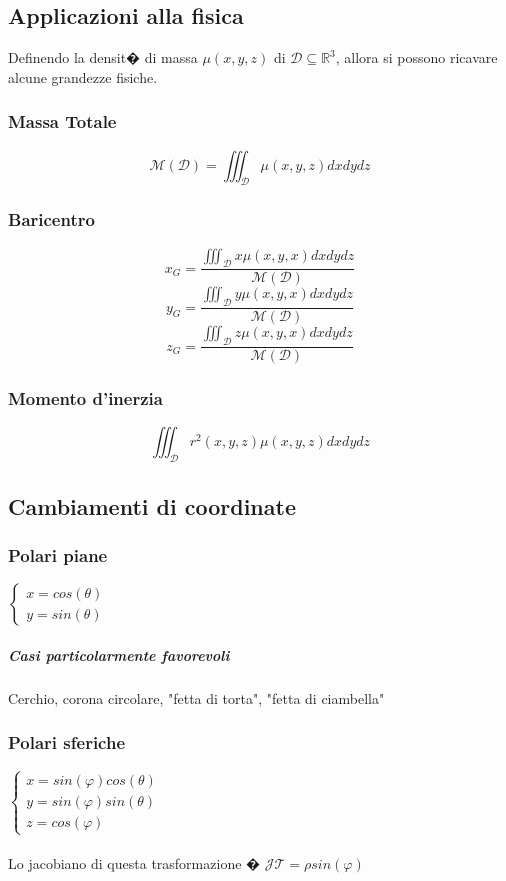 \documentclass[10pt,a4paper]{report}
\begin{document}
		\subsection*{Applicazioni alla fisica}
		Definendo la densit� di massa $ \mu (x,y,z) $ di $\mathcal{D}\subseteq \mathbb{R}^{3}$, allora si possono ricavare alcune grandezze fisiche.
			\subsubsection{Massa Totale}
			\[ \mathcal{M}(\mathcal{D})= \iiint_{\mathcal{D}} \mu(x,y,z) dx dy dz \]
			
			\subsubsection{Baricentro}
			\[ x_{G}=\frac{\iiint_{\mathcal{D}} x \mu (x,y,x) dx dy dz}{ \mathcal{M}(\mathcal{D})} \]
			\[ y_{G}=\frac{\iiint_{\mathcal{D}} y \mu (x,y,x) dx dy dz}{ \mathcal{M}(\mathcal{D})} \]
			\[ z_{G}=\frac{\iiint_{\mathcal{D}} z \mu (x,y,x) dx dy dz}{ \mathcal{M}(\mathcal{D})} \]
			
			\subsubsection{Momento d'inerzia}
			\[ \iiint_{\mathcal{D}} r^{2}(x,y,z) \mu(x,y,z) dx dy dz \]

		\subsection*{Cambiamenti di coordinate}
			\subsubsection{Polari piane}
			$ \begin{cases} 
				x=cos(\theta) \\ 
				y=sin(\theta)
			\end{cases} $
				\subparagraph{Casi particolarmente favorevoli}
				Cerchio, corona circolare, "fetta di torta", "fetta di ciambella"
			\subsubsection{Polari sferiche}
			$ \begin{cases} 
				x=sin(\varphi)cos(\theta) \\ 
				y=sin(\varphi)sin(\theta) \\
				z=cos(\varphi)
			\end{cases} $
			\\ \\
			Lo jacobiano di questa trasformazione � $ \mathcal{J} \mathcal{T} = \rho sin(\varphi) $
			
\end{document}

